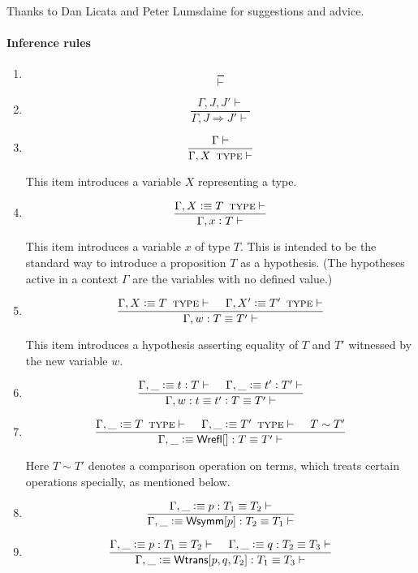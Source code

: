 \documentclass[11pt]{article}
\newcommand{\eqd}{\equiv}
\newcommand{\spc}{{\,\,\,\,\,\,\,}}
\newcommand{\ccolon}{\vcentcolon}
\newcommand{\Type}{\mathop{\text{ \sc type}}}
\newcommand{\Okay}{\mathop{\text{ \sc okay}}}
\newcommand{\Context}{\vdash\Okay}
\renewcommand{\Context}{\vdash}
\newcommand{\ha}[2]{#1[#2]}
\newcommand{\Wrefl}{{\sf Wrefl}}
\newcommand{\Wtrans}{{\sf Wtrans}}
\newcommand{\Wsymm}{{\sf Wsymm}}
\newcommand{\var}{\char`_}
\newcommand{\defn}{\vcentcolon\equiv}
\begin{document}
Thanks to Dan Licata and Peter Lumsdaine for suggestions and advice.

\paragraph{Inference rules} 

\begin{enumerate}

\item
$$\frac{}{\Context}$$

\item
$$\frac{\Gamma,J,J'\Context}{\Gamma,J \Rightarrow J' \Context}$$

\item
$$\frac{\Gamma\Context}{\Gamma, X \Type \Context}$$

This item introduces a variable $X$ representing a type.

\item
$$\frac{\Gamma, X \defn T \Type \Context}{\Gamma, x \ccolon T \Context}$$

This item introduces a variable $x$ of type $T$.  This is intended to be the
standard way to introduce a proposition $T$ as a hypothesis.  (The hypotheses
active in a context $\Gamma$ are the variables with no defined value.)

\item
$$\frac{
  \Gamma, X \defn T \Type\Context  
  \spc
  \Gamma, X' \defn T' \Type\Context }
{\Gamma, w : T \eqd T' \Context}$$

This item introduces a hypothesis asserting equality of $T$ and $T'$ witnessed
by the new variable $w$.

\item
  \[\frac{
  \Gamma, \var \defn t \ccolon T \Context
  \spc
  \Gamma, \var \defn t' \ccolon T' \Context
  } {
  \Gamma, w : t \eqd t' \ccolon T \eqd T' \Context}\]

\item 
\[\frac{\Gamma, \var \defn T \Type \Context \spc \Gamma, \var \defn T'\Type \Context
  \spc T\sim T'}{
  \Gamma, \var \defn \ha\Wrefl{}: T\eqd T' \Context
}
\]

Here $T\sim T'$ denotes a comparison operation on terms, which treats certain
operations specially, as mentioned below.

\item 
$$\frac{\Gamma,\var\defn p:T_1\eqd T_2 \Context }{\Gamma, \var\defn \ha\Wsymm{p}:T_2\eqd T_1 \Context}$$

\item 
\[
  \frac{
    \Gamma, \var \defn p:T_1\eqd T_2 \Context
    \spc
    \Gamma, \var \defn q:T_2\eqd T_3 \Context
  }
  {\Gamma, \var \defn \ha\Wtrans{p,q,T_2}: T_1\eqd T_3 \Context}
\]


\end{enumerate}
\end{document}
